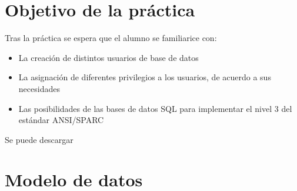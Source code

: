 
\usepackage{eurosym}




\renewcommand{\hmwkTitle}{Modificación concurente de datos}
\renewcommand{\hmwkClass}{Gestión de Bases de Datos}

\usepackage{enumitem}%


\setlength{\columnseprule}{0.4pt}
\newcommand{\Simultaneo}[2]{
  \begin{multicols}{2}
    #1
    \vfill \null
    \columnbreak
    #2
    \vfill \null
  \end{multicols}
}






\primerapagina


\section{Objetivo de la práctica}
Tras la práctica se espera que el alumno se familiarice con:
\begin{itemize}
\item La creación de distintos usuarios de base de datos
\item La asignación de diferentes privilegios a los usuarios, de acuerdo a sus necesidades
\item Las posibilidades de las bases de datos SQL para implementar el nivel 3 del estándar ANSI/SPARC
\end{itemize}

Se puede descargar 

\section{Modelo de datos}


